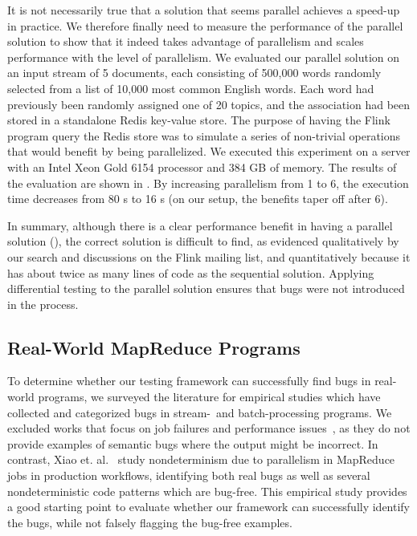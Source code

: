 It is not necessarily true that a solution that seems parallel achieves a speed-up in practice.
We therefore finally need to measure the performance of the parallel solution to show that it indeed takes advantage of parallelism and scales performance with the level of parallelism.
We evaluated our parallel solution on an input stream of 5 documents, each consisting of
500,000 words randomly selected from a list of 10,000 most common English words.
Each word had previously been randomly assigned one of 20 topics, and the
association had been stored in a standalone Redis key-value store. The purpose
of having the Flink program query the Redis store was to simulate a series of
non-trivial operations that would benefit by being parallelized.
We executed this experiment on a server with an Intel Xeon Gold 6154 processor and 384 GB of memory.
The results
of the evaluation are shown in . By increasing
parallelism from 1 to 6, the execution time decreases from 80 s to
16 s (on our setup, the benefits taper off after 6).

In summary, although there is a clear performance benefit in having a parallel solution (), the correct solution is difficult to find, as evidenced qualitatively by our search and discussions on the Flink mailing list, and quantitatively because it has about twice as many lines of code as the sequential solution.
Applying differential testing to the parallel solution ensures that bugs were not introduced in the process.

\subsection{Real-World MapReduce Programs}
\label{diffstream:ssec:evaluation-mapreduce}

To determine whether our testing framework can successfully find bugs in real-world programs, we surveyed the literature for empirical studies which have collected and categorized bugs in stream-~and batch-processing programs. We excluded works that focus on job failures and performance issues~\cite{schroeder2009large,kavulya2010analysis,li2013characteristic,zhou2015empirical}, as they do not provide examples of semantic bugs where the output might be incorrect.
In contrast, Xiao et. al.~\cite{xiao2014nondeterminism} study
nondeterminism due to parallelism
in MapReduce jobs in production workflows,
identifying both real bugs as well as several nondeterministic code patterns which are bug-free.
This empirical study provides a good starting point to evaluate whether our framework can successfully identify the bugs, while not falsely flagging the bug-free examples.

